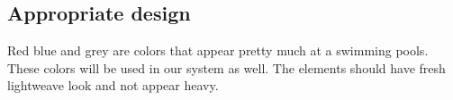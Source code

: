 \subsection*{Appropriate design}
\par
Red blue and grey are colors that appear pretty much at a swimming pools. These colors will be used in our system as well. The elements should have fresh lightweave look and not appear heavy.
